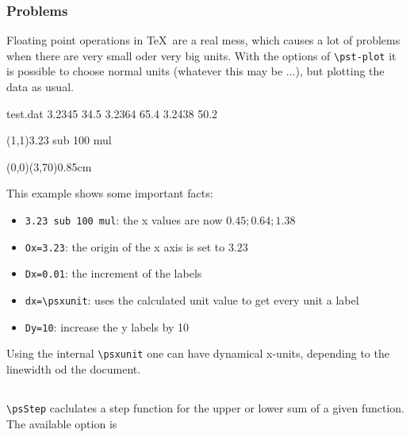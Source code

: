 \subsubsection{Problems}
Floating point operations in \TeX\ are a real mess, which causes a lot of problems
when there are very small oder very big units. With the options of \verb+\pst-plot+
it is possible to choose normal units (whatever this may be ...), but plotting
the data as usual.

\begin{LTXexample}[pos=t]
\begin{filecontents*}{test.dat}
3.2345 34.5
3.2364 65.4
3.2438 50.2
\end{filecontents*}

\pstScalePoints(1,1){3.23 sub 100 mul}{}
\begin{psgraph}[Ox=3.23,Dx=0.01,dx=\psxunit,Dy=10](0,0)(3,70){0.8\linewidth}{5cm}%
  \listplot[showpoints=true,plotstyle=curve]{\data}
\end{psgraph}
\end{LTXexample}

This example shows some important facts:
\begin{itemize}
\item \verb+3.23 sub 100 mul+: the x values are now $0.45; 0.64; 1.38$
\item \verb+Ox=3.23+: the origin of the x axis is set to $3.23$
\item \verb+Dx=0.01+: the increment of the labels
\item \verb+dx=\psxunit+: uses the calculated unit value to get every unit a label
\item \verb+Dy=10+: increase the y labels by 10
\end{itemize}

Using the internal \verb+\psxunit+ one can have dynamical x-units, depending to
the linewidth od the document.

\resetOptions

\subsection{}
\verb+\psStep+ caclulates a step function for the upper or lower sum of a given
function. The available option is

